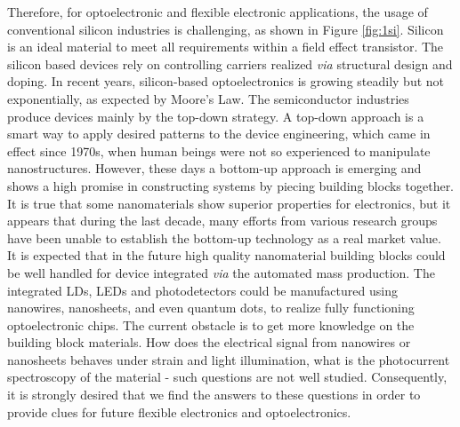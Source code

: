 Therefore, for optoelectronic and flexible electronic applications, the usage of conventional silicon industries is challenging, as shown in Figure \ref{fig:1si}. Silicon  is an ideal material to meet all requirements within a field effect transistor. The silicon based devices rely on controlling carriers realized \textit{via} structural design and doping. In recent years, silicon-based optoelectronics is growing steadily but not exponentially, as expected by Moore's Law. \cite{Waldrop2016} 
The semiconductor industries produce devices mainly by the top-down strategy. A top-down approach is a smart way to apply desired patterns to the device engineering, which came in effect since 1970s, when human beings were not so experienced to manipulate nanostructures. However, these days a bottom-up approach is emerging and shows a high promise in constructing systems by piecing building blocks together. It is true that some nanomaterials show superior properties for electronics, but it appears that during the last decade, many efforts from various research groups have been unable to establish the bottom-up technology as a real market value. \\
It is expected that in the future high quality nanomaterial building blocks could be well handled for device integrated \textit{via} the automated mass production. The integrated LDs, LEDs and photodetectors could be manufactured using nanowires, nanosheets, and even quantum dots, to realize fully functioning optoelectronic chips. The current obstacle is to get more knowledge on the building block materials. How does the electrical signal from nanowires or nanosheets behaves under strain and light illumination, what is the photocurrent spectroscopy of the material - such questions are not well studied. Consequently, it is strongly desired that we find the answers to these questions in order to provide clues for future flexible electronics and optoelectronics. 

